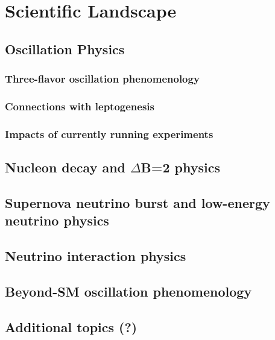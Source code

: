 \chapter{Scientific Landscape}
\label{ch:physics-atmpdk}



\section{Oscillation Physics}
\label{sec:landscape-osc}

\subsection{Three-flavor oscillation phenomenology}
\label{sec:landscape-osc-3flavor}

\subsection{Connections with leptogenesis} 
\label{sec:landscape-osc-leptogen}


\subsection{Impacts of currently running experiments}
\label{sec:landscape-osc-impacts}


\section{Nucleon decay and $\Delta$B=2 physics}
\label{sec:landscape-ndk}


\section{Supernova neutrino burst and low-energy neutrino physics}
\label{sec:landscape-snb-lowe}


\section{Neutrino interaction physics}
\label{sec:landscape-nu-interaction}

\section{Beyond-SM oscillation phenomenology}
\label{sec:landscape-bsm}

\section{Additional topics (?)}
\label{sec:landscape-addl}
